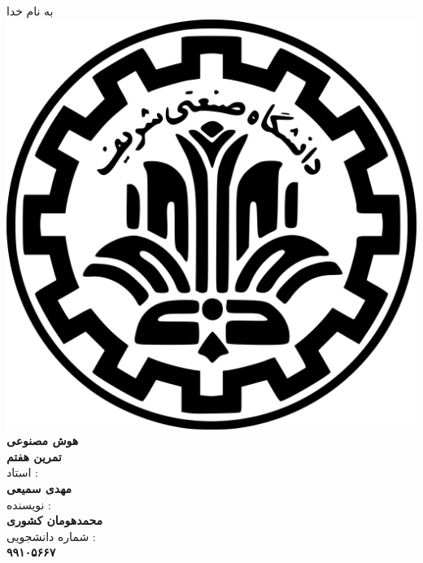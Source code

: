 \begin{center}
    به نام خدا
    \\
    \includegraphics[scale=0.02]{commons/sharif.png}
    \\
    \vspace*{5mm}
    \textbf{\Huge{هوش مصنوعی}}
    \hspace*{1mm}
    \vspace*{5mm}
    \\
    \vspace*{5mm}
    \textbf{تمرین هفتم}
    \\
    \vspace*{7mm}
    استاد :
    \\
    \vspace*{2mm}
    \textbf{\Large{مهدی سمیعی}}
    \\
    \vspace*{7mm}
    نویسنده :
    \\
    \vspace*{2mm}
    \textbf{\Large{محمدهومان کشوری}}
    \\
    \vspace*{7mm}
    شماره دانشجویی :
    \\
    \vspace*{2mm}
    \textbf{\Large{۹۹۱۰۵۶۶۷}}
\end{center}